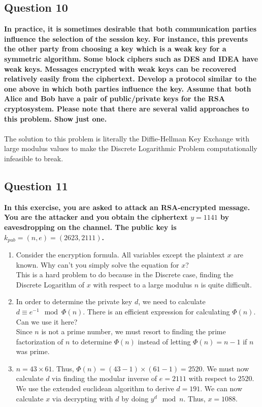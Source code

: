 \documentclass[titlepage]{article}
\begin{document}
{\subsection{Question 10}
{
\textbf{In practice, it is sometimes desirable that both communication parties influence the selection of the session key. For instance, this prevents the other party from choosing a key which is a weak key for a symmetric algorithm. Some block ciphers such as DES and IDEA have weak keys. Messages encrypted with weak keys can be recovered relatively easily from the ciphertext. Develop a protocol similar to the one above in which both parties influence the key. Assume that both Alice and Bob have a pair of public/private keys for the RSA cryptosystem. Please note that there are several valid approaches to this problem. Show just one.}\\\\The solution to this problem is literally the Diffie-Hellman Key Exchange with large modulus values to make the Discrete Logarithmic Problem computationally infeasible to break.
}
\clearpage
\subsection{Question 11}
{
\textbf{In this exercise, you are asked to attack an RSA-encrypted message. You are the attacker and you obtain the ciphertext \(y = 1141\) by eavesdropping on the channel. The public key is \(k_{pub} = (n, e) = (2623, 2111)\).}
\begin{enumerate}
    \item Consider the encryption formula. All variables except the plaintext \(x\) are known. Why can't you simply solve the equation for \(x\)? \\This is a hard problem to do because in the Discrete case, finding the Discrete Logarithm of \(x\) with respect to a large modulus \(n\) is quite difficult.
    \item In order to determine the private key \(d\), we need to calculate \(d \equiv e^{-1} \mod \Phi(n)\). There is an efficient expression for calculating \(\Phi(n)\). Can we use it here?\\Since \(n\) is not a prime number, we must resort to finding the prime factorization of \(n\) to determine \(\Phi(n)\) instead of letting \(\Phi(n) = n - 1\) if \(n\) was prime.
    \item \(n = 43 \times 61\). Thus, \(\Phi(n) = (43 - 1) \times (61 -1) = 2520\). We must now calculate \(d\) via finding the modular inverse of \(e = 2111\) with respect to \(2520\). We use the extended euclidean algorithm to derive \(d = 191\). We can now calculate \(x\) via decrypting with \(d\) by doing \(y^d \mod n\). Thus, \(x = 1088\). 
\end{enumerate}
}
}
\end{document}
